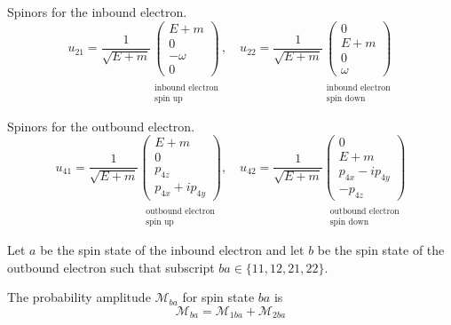 Spinors for the inbound electron.
\begin{equation*}
u_{21}=\frac{1}{\sqrt{E+m}}
\underset{\substack{\\ \text{inbound electron}\\ \text{spin up}}}
{\begin{pmatrix}
E+m\\
0\\
-\omega\\
0
\end{pmatrix}},
\quad
u_{22}=\frac{1}{\sqrt{E+m}}
\underset{\substack{\\ \text{inbound electron}\\ \text{spin down}}}
{\begin{pmatrix}
0\\
E+m\\
0\\
\omega
\end{pmatrix}}
\end{equation*}

Spinors for the outbound electron.
\begin{equation*}
u_{41}=\frac{1}{\sqrt{E+m}}
\underset{\substack{\\ \text{outbound electron}\\ \text{spin up}}}
{\begin{pmatrix}
E+m\\
0\\
p_{4z}\\
p_{4x}+ip_{4y}
\end{pmatrix}},
\quad
u_{42}=\frac{1}{\sqrt{E+m}}
\underset{\substack{\\ \text{outbound electron}\\ \text{spin down}}}
{\begin{pmatrix}
0\\
E+m\\
p_{4x}-ip_{4y}\\
-p_{4z}
\end{pmatrix}}
\end{equation*}

Let $a$ be the spin state of the inbound electron and let $b$
be the spin state of the outbound electron
such that subscript $ba\in\{11,12,21,22\}$.

\bigskip
The probability amplitude $\mathcal M_{ba}$ for spin state $ba$ is
\begin{equation*}
\mathcal M_{ba}=\mathcal M_{1ba}+\mathcal M_{2ba}
\end{equation*}

